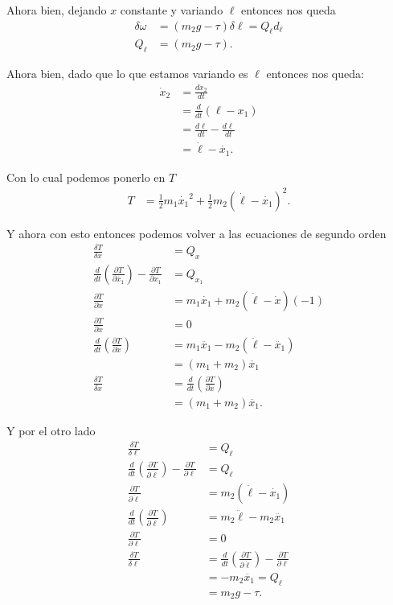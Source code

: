 \documentclass{report}
\begin{document}
Ahora bien, dejando $x$ constante y variando $\ell$ entonces nos queda
\begin{align*}
  \delta \omega &= \left( m_2g - \tau \right)\delta \ell = Q_\ell d_\ell \\
  Q_\ell &= \left( m_2g - \tau \right)
.\end{align*}

Ahora bien, dado que lo que estamos variando es $\ell$ entonces nos queda:
\begin{align*}
  \dot{x}_2 &= \frac{dx_2}{dt} \\
  &= \frac{d}{dt}\left( \ell - x_1 \right)  \\
  &= \frac{d\ell}{dt} - \frac{d\ell}{dt} \\
  &= \dot{\ell} - \dot{x_1}
.\end{align*}

Con lo cual podemos ponerlo en $T$ 
\begin{align*}
  T &= \frac{1}{2}m_1\dot{x_1}^2 + \frac{1}{2}m_2\left( \dot{\ell} - \dot{x_1} \right)^2
.\end{align*}

Y ahora con esto entonces podemos volver a las ecuaciones de segundo orden
\begin{align*}
  \frac{\delta T}{\delta x} &= Q_x \\
  \frac{d}{dt}\left( \frac{\partial T}{\partial \dot{x_1}}  \right) - \frac{\partial T}{\partial x_1} &= Q_{x_1} \\
  \frac{\partial T}{\partial \dot{x}}&=m_1\dot{x_1}+m_2\left( \dot{\ell} - \dot{x} \right) \left( -1\right)\\
  \frac{\partial T}{\partial x}  &= 0 \\
  \frac{d}{dt}\left( \frac{\partial T}{\partial \dot{x}}  \right) &= m_1\ddot{x_1} - m_2\left( \ddot{\ell} - \ddot{x_1} \right)  \\
								  &= \left( m_1 + m_2 \right) \ddot{x_1} \\
  \frac{\delta T}{\delta x} &= \frac{d}{dt}\left( \frac{\partial T}{\partial \dot{x}}  \right)  \\
			    &= \left( m_1 + m_2 \right) \ddot{x_1}
.\end{align*}

Y por el otro lado
\begin{align*}
  \frac{\delta T}{\delta \ell} &= Q_\ell \\
  \frac{d}{dt}\left( \frac{\partial T}{\partial \dot{\ell}}  \right) - \frac{\partial T}{\partial \ell} &= Q_\ell \\
  \frac{\partial T}{\partial \dot{\ell}} &= m_2\left( \dot{\ell} - \dot{x_1} \right)  \\
  \frac{d}{dt}\left( \frac{\partial T}{\partial \dot{\ell}}  \right) &= m_2 \ddot{\ell} - m_2\ddot{x_1} \\
  \frac{\partial T}{\partial \ell} &= 0 \\
  \frac{\delta T}{\delta \ell} &= \frac{d}{dt}\left( \frac{\partial T}{\partial \dot{\ell}}  \right) - \frac{\partial T}{\partial \ell}  \\
			       &= -m_2\ddot{x_1} = Q_\ell \\
			       &= m_2g - \tau
.\end{align*}
\end{document}
